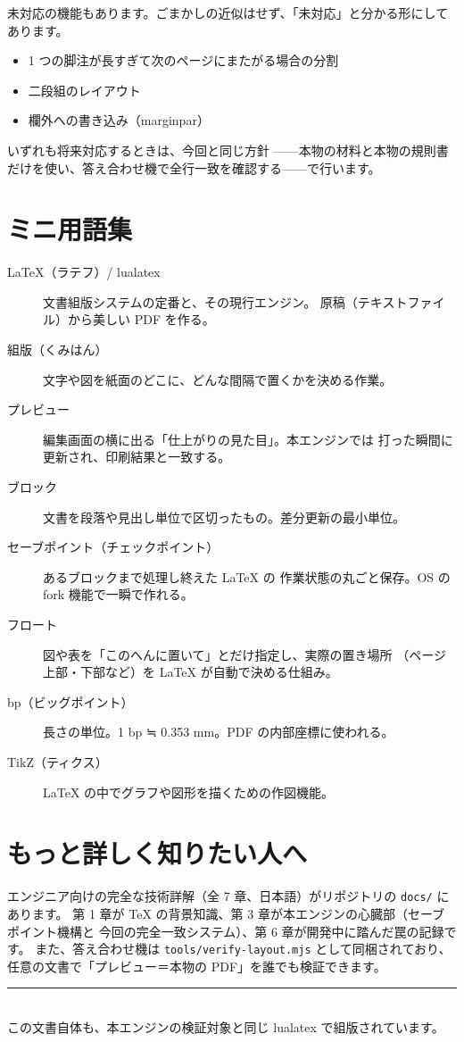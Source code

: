 \documentclass[11pt,a4paper]{ltjsarticle}
\newcommand{\code}[1]{\texttt{#1}}
\begin{document}
未対応の機能もあります。ごまかしの近似はせず、「未対応」と分かる形にしてあります。

\begin{itemize}
\item 1 つの脚注が長すぎて次のページにまたがる場合の分割
\item 二段組のレイアウト
\item 欄外への書き込み（marginpar）
\end{itemize}

いずれも将来対応するときは、今回と同じ方針
——本物の材料と本物の規則書だけを使い、答え合わせ機で全行一致を確認する——で行います。

\section{ミニ用語集}

\begin{description}
\item[LaTeX（ラテフ）/ lualatex] 文書組版システムの定番と、その現行エンジン。
  原稿（テキストファイル）から美しい PDF を作る。
\item[組版（くみはん）] 文字や図を紙面のどこに、どんな間隔で置くかを決める作業。
\item[プレビュー] 編集画面の横に出る「仕上がりの見た目」。本エンジンでは
  打った瞬間に更新され、印刷結果と一致する。
\item[ブロック] 文書を段落や見出し単位で区切ったもの。差分更新の最小単位。
\item[セーブポイント（チェックポイント）] あるブロックまで処理し終えた LaTeX の
  作業状態の丸ごと保存。OS の fork 機能で一瞬で作れる。
\item[フロート] 図や表を「このへんに置いて」とだけ指定し、実際の置き場所
  （ページ上部・下部など）を LaTeX が自動で決める仕組み。
\item[bp（ビッグポイント）] 長さの単位。1 bp ≒ 0.353 mm。PDF の内部座標に使われる。
\item[TikZ（ティクス）] LaTeX の中でグラフや図形を描くための作図機能。
\end{description}

\section{もっと詳しく知りたい人へ}

エンジニア向けの完全な技術詳解（全 7 章、日本語）がリポジトリの \code{docs/} にあります。
第 1 章が TeX の背景知識、第 3 章が本エンジンの心臓部（セーブポイント機構と
今回の完全一致システム）、第 6 章が開発中に踏んだ罠の記録です。
また、答え合わせ機は \code{tools/verify-layout.mjs} として同梱されており、
任意の文書で「プレビュー＝本物の PDF」を誰でも検証できます。

\vspace{1.5em}
\begin{center}
\rule{0.6\textwidth}{0.4pt}\\[0.5em]
\small この文書自体も、本エンジンの検証対象と同じ lualatex で組版されています。
\end{center}
\end{document}
